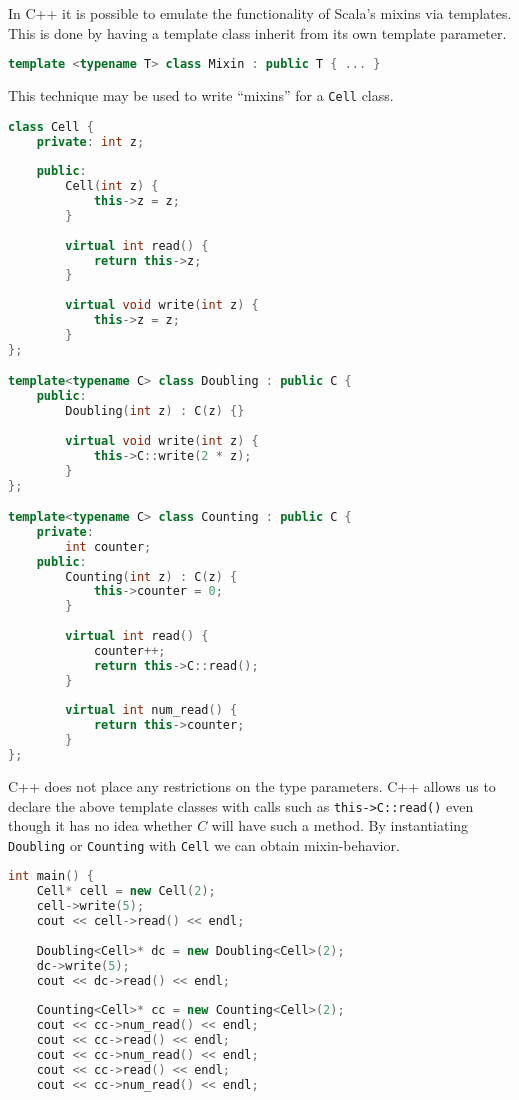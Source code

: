 \documentclass{article}
\begin{document}
\begin{example}
  In C++ it is possible to emulate the functionality of Scala's mixins via templates.
  This is done by having a template class inherit from its own template parameter.
\begin{lstlisting}[escapechar=|, language=C++]
template <typename T> class Mixin : public T { ... }
\end{lstlisting}
  This technique may be used to write ``mixins'' for a \texttt{Cell} class.
\begin{lstlisting}[escapechar=|, language=C++]
class Cell {
    private: int z;
    
    public:
        Cell(int z) {
            this->z = z;
        }
        
        virtual int read() {
            return this->z;
        }
        
        virtual void write(int z) {
            this->z = z;
        }
};

template<typename C> class Doubling : public C {
    public:
        Doubling(int z) : C(z) {}
        
        virtual void write(int z) {
            this->C::write(2 * z);
        }
};

template<typename C> class Counting : public C {
    private:
        int counter;
    public:
        Counting(int z) : C(z) {
            this->counter = 0;
        }
        
        virtual int read() {
            counter++;
            return this->C::read();
        }
        
        virtual int num_read() {
            return this->counter;
        }
};
\end{lstlisting}
  C++ does not place any restrictions on the type parameters.
  C++ allows us to declare the above template classes with calls such as \texttt{this->C::read()} even though it has no idea whether $C$ will have such a method.
  By instantiating \texttt{Doubling} or \texttt{Counting} with \texttt{Cell} we can obtain mixin-behavior.
\begin{lstlisting}[escapechar=|, language=C++]
int main() {
    Cell* cell = new Cell(2);
    cell->write(5);
    cout << cell->read() << endl;
    
    Doubling<Cell>* dc = new Doubling<Cell>(2);
    dc->write(5);
    cout << dc->read() << endl;
    
    Counting<Cell>* cc = new Counting<Cell>(2);
    cout << cc->num_read() << endl;
    cout << cc->read() << endl;
    cout << cc->num_read() << endl;
    cout << cc->read() << endl;
    cout << cc->num_read() << endl;
    

\end{lstlisting}
\end{example}
\end{document}
